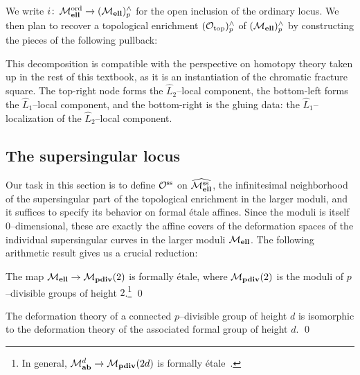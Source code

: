 \noindent We write \(i\colon\thinspace \mathcal{M}_{\mathbf{ell}}^{\mathrm{ord}} \to (\mathcal{M}_{\mathbf{ell}})^\wedge_p\) for the open inclusion of the ordinary locus.  We then plan to recover a topological enrichment \((\mathcal{O}_{\mathrm{top}})^\wedge_p\) of \((\mathcal{M}_{\mathbf{ell}})^\wedge_p\) by constructing the pieces of the following pullback:
\begin{center}
\end{center}
This decomposition is compatible with the perspective on homotopy theory taken up in the rest of this textbook, as it is an instantiation of the chromatic fracture square.  The top-right node forms the \(\widehat L_2\)--local component, the bottom-left forms the \(\widehat L_1\)--local component, and the bottom-right is the gluing data: the \(\widehat L_1\)--localization of the \(\widehat L_2\)--local component.






\subsection*{The supersingular locus}

Our task in this section is to define \(\mathcal{O}^{\mathrm{ss}}\) on \(\widehat{\mathcal{M}_{\mathbf{ell}}^{\mathrm{ss}}}\), the infinitesimal neighborhood of the supersingular part of the topological enrichment in the larger moduli, and it suffices to specify its behavior on formal \'etale affines.  Since the moduli is itself \(0\)--dimensional, these are exactly the affine covers of the deformation spaces of the individual supersingular curves in the larger moduli \(\mathcal{M}_{\mathbf{ell}}\).  The following arithmetic result gives us a crucial reduction:

\begin{theorem}
The map \(\mathcal{M}_{\mathbf{ell}} \to \mathcal{M}_{\mathbf{pdiv}}(2)\) is formally \'etale, where \(\mathcal{M}_{\mathbf{pdiv}}(2)\) is the moduli of \(p\)--divisible groups of height \(2\).\footnote{In general, \(\mathcal{M}_{\mathbf{ab}}^{d} \to \mathcal{M}_{\mathbf{pdiv}}(2d)\) is formally \'etale~\cite[Appendix 1]{KatzSTLocalModuli}.} \qed
\end{theorem}
\begin{lemma}
The deformation theory of a connected \(p\)--divisible group of height \(d\) is isomorphic to the deformation theory of the associated formal group of height \(d\). \qed
\end{lemma}

